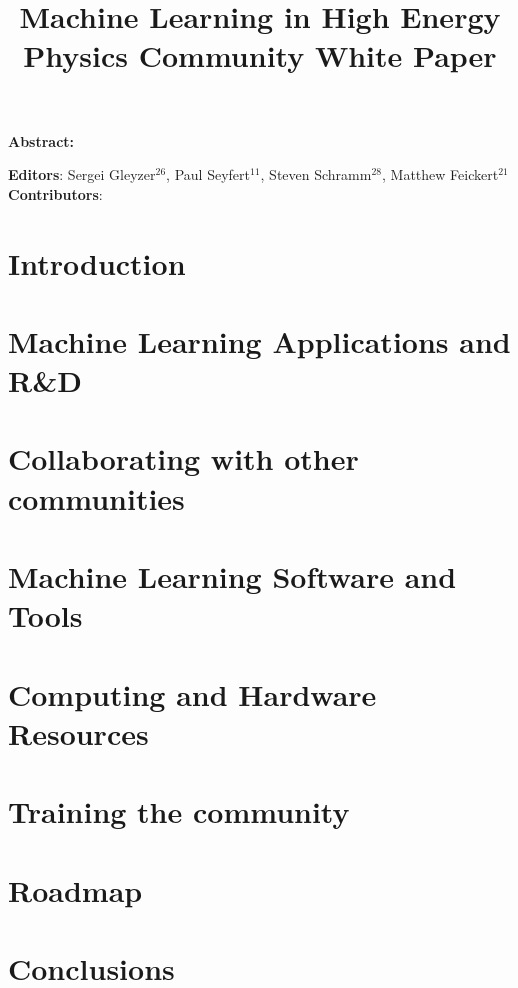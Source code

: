 \documentclass{article}
\begin{document}
\title{Machine Learning in High Energy Physics Community White Paper}

\maketitle

\setlength\parindent{0pt}
\textbf{Abstract:}

\vskip 1cm
\textbf{Editors}: Sergei Gleyzer$^{26}$, Paul Seyfert$^{11}$, Steven Schramm$^{28}$, Matthew Feickert$^{21}$\\
\newline
\textbf{Contributors}:


\tableofcontents
\clearpage

\section{Introduction}
\label{sec:introduction}


\section{Machine Learning Applications and R\&D}
\label{sec:applications}


\section{Collaborating with other communities}
\label{sec:collaboration}


\section{Machine Learning Software and Tools}
\label{sec:software}


\section{Computing and Hardware Resources}
\label{sec:resources}


\section{Training the community}
\label{sec:training}


\section{Roadmap}
\label{sec:roadmap}


\section{Conclusions}
\label{sec:conclusions}


\appendix

\clearpage

\printbibliography[title={References}]
\end{document}
